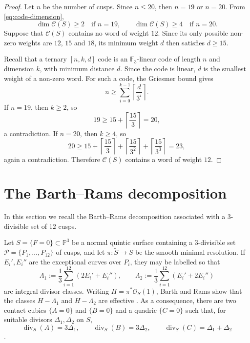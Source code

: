 \documentclass[10pt,a4paper]{article}
\begin{document}
\begin{proof}
Let $n$ be the number of cusps.  Since $n\leq20$, then
$n=19$ or $n=20$.  From \eqref{eq:code-dimension},
\[
        \dim\mathcal C(S)\geq2\quad\text{if }n=19,
        \qquad
        \dim\mathcal C(S)\geq4\quad\text{if }n=20.
\]
Suppose that $\mathcal C(S)$ contains no word of weight $12$.  Since its only
possible non-zero weights are $12$, $15$ and $18$, its minimum weight $d$
then satisfies $d\geq 15$.

Recall that a ternary $[n,k,d]$ code is an $\mathbb F_3$-linear code
of length $n$ and dimension $k$, with minimum distance $d$.  Since the code is
linear, $d$ is the smallest weight of a non-zero word.  For such a code, the
Griesmer bound gives \cite[Corollary~2.1.4]{Tan_cusps}
\[
        n\geq\sum_{i=0}^{k-1}
        \left\lceil\frac{d}{3^i}\right\rceil.
\]
If $n=19$, then $k\geq2$, so
\[
        19\geq15+\left\lceil\frac{15}{3}\right\rceil=20,
\]
a contradiction.  If $n=20$, then $k\geq4$, so
\[
        20\geq
        15+\left\lceil\frac{15}{3}\right\rceil
        +\left\lceil\frac{15}{3^2}\right\rceil
        +\left\lceil\frac{15}{3^3}\right\rceil
        =23,
\]
again a contradiction.  Therefore $\mathcal C(S)$ contains a word of weight
$12$.
\end{proof}




\section{The Barth--Rams decomposition}
\label{sec:BR}

In this section we recall the Barth--Rams decomposition associated with a $3$-divisible set of $12$ cusps.

Let $S=\{F=0\}\subset\mathbb P^3$ be a normal quintic surface containing a
$3$-divisible set $\mathcal P=\{P_1,\ldots,P_{12}\}$
of cusps, and let $\pi\colon\widetilde S\to S$ be the smooth minimal resolution.  If
$E_i',E_i''$ are the exceptional curves over $P_i$, they may be labelled so
that
\[
 \Lambda_1:=\frac{1}{3}\sum_{i=1}^{12}(2E_i'+E_i''),
 \qquad
 \Lambda_2:=\frac{1}{3}\sum_{i=1}^{12}(E_i'+2E_i'')
\]
are integral divisor classes.  
Writing $H=\pi^*\mathcal O_S(1)$, Barth and Rams show that the classes
$H-\Lambda_1$ and $H-\Lambda_2$ are effective
\cite[Proposition~1.1]{BarthRams_equations}. As a consequence, there are two
contact cubics $\{A=0\}$ and $\{B=0\}$ and a quadric $\{C=0\}$ such that, for suitable
divisors $\Delta_1,\Delta_2$ on $S$,
\[
\operatorname{div}_S(A)=3\Delta_1,
\qquad
\operatorname{div}_S(B)=3\Delta_2,
\qquad
\operatorname{div}_S(C)=\Delta_1+\Delta_2
\]
\cite[Theorem~1.2]{BarthRams_equations}.
\end{document}
